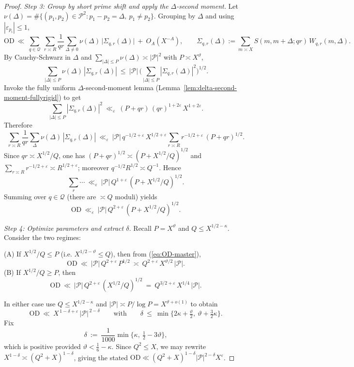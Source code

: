 \documentclass[11pt]{article}
\def\eqref#1{(\ref{#1})}%
\theoremstyle{definition}
\theoremstyle{remark}
\numberwithin{equation}{part}
\begin{document}
\begin{proof}
	\emph{Step 3: Group by short prime shift and apply the $\Delta$-second moment.}
	Let $\nu(\Delta)=\#\{(p_1,p_2)\in\mathcal P^2: p_1-p_2=\Delta,\ p_1\ne p_2\}$.
	Grouping by $\Delta$ and using $|\varepsilon_{p_i}|\le1$,
	\[
		\mathrm{OD}\ \ll\ \sum_{q\in\mathcal Q}\ \sum_{r\asymp R}\frac{1}{qr}
		\sum_{\Delta\ne 0}\nu(\Delta)\,\Big|\Sigma_{q,r}(\Delta)\Big|
		\ +\ O_A(X^{-A}),
		\qquad
		\Sigma_{q,r}(\Delta):=\sum_{m\asymp X} S(m,m+\Delta;qr)\,W_{q,r}(m,\Delta).
	\]
	By Cauchy-Schwarz in $\Delta$ and $\sum_{|\Delta|\le P}\nu(\Delta)\asymp|\mathcal P|^2$ with $P\asymp X^\vartheta$,
	\[
		\sum_{|\Delta|\le P}\nu(\Delta)\,|\Sigma_{q,r}(\Delta)|
		\ \le\ |\mathcal P|\,\Big(\sum_{|\Delta|\le P}|\Sigma_{q,r}(\Delta)|^2\Big)^{1/2}.
	\]
	Invoke the fully uniform $\Delta$-second-moment lemma (Lemma~\ref{lem:delta-second-moment-fullyrigid}) to get
	\[
		\sum_{|\Delta|\le P}|\Sigma_{q,r}(\Delta)|^2
		\ \ll_\varepsilon\ (P+qr)\,(qr)^{1+2\varepsilon}\,X^{1+2\varepsilon}.
	\]
	Therefore
	\[
		\sum_{r\asymp R}\frac{1}{qr}\sum_{\Delta}\nu(\Delta)\,|\Sigma_{q,r}(\Delta)|
		\ \ll_\varepsilon\ |\mathcal P|\,q^{-1/2+\varepsilon}\,X^{1/2+\varepsilon}
		\sum_{r\asymp R} r^{-1/2+\varepsilon}\,(P+qr)^{1/2}.
	\]
	Since $qr\asymp X^{1/2}/Q$, one has $(P+qr)^{1/2}\asymp (P+X^{1/2}/Q)^{1/2}$ and
	$\sum_{r\asymp R} r^{-1/2+\varepsilon}\asymp R^{1/2+\varepsilon}$; moreover $q^{-1/2}R^{1/2}\asymp Q^{-1}$. Hence
	\[
		\sum_{r}\cdots\ \ll_\varepsilon\ |\mathcal P|\,Q^{1+\varepsilon}\,(P+X^{1/2}/Q)^{1/2}.
	\]
	Summing over $q\in\mathcal Q$ (there are $\asymp Q$ moduli) yields
	\begin{equation}\label{eq:OD-master}
		\mathrm{OD}\ \ll_\varepsilon\ |\mathcal P|\,Q^{2+\varepsilon}\,(P+X^{1/2}/Q)^{1/2}.
	\end{equation}

	\emph{Step 4: Optimize parameters and extract $\delta$.}
	Recall $P=X^\vartheta$ and $Q\le X^{1/2-\kappa}$. Consider the two regimes:

	\smallskip
	\noindent(A) If $X^{1/2}/Q\le P$ (i.e. $X^{1/2-\vartheta}\le Q$), then from \eqref{eq:OD-master},
	\[
		\mathrm{OD}\ \ll\ |\mathcal P|\,Q^{2+\varepsilon}\,P^{1/2}
		\ \asymp\ Q^{2+\varepsilon}\,X^{\vartheta/2}\,|\mathcal P|.
	\]
	(B) If $X^{1/2}/Q\ge P$, then
	\[
		\mathrm{OD}\ \ll\ |\mathcal P|\,Q^{2+\varepsilon}\,(X^{1/2}/Q)^{1/2}
		\ =\ Q^{3/2+\varepsilon}\,X^{1/4}\,|\mathcal P|.
	\]

	In either case use $Q\le X^{1/2-\kappa}$ and $|\mathcal P|\asymp P/\log P=X^{\vartheta+o(1)}$ to obtain
	\[
		\mathrm{OD}\ \ll\ X^{\,1-\delta+\varepsilon}\,|\mathcal P|^{\,2-\delta}
		\qquad\text{with}\qquad
		\delta\ \le\ \min\Big\{2\kappa+\tfrac{\vartheta}{2},\ \vartheta+\tfrac{3}{2}\kappa\Big\}.
	\]
	Fix
	\[
		\delta\ :=\ \frac{1}{1000}\min\Big\{\kappa,\ \tfrac12-3\vartheta\Big\},
	\]
	which is positive provided $\vartheta<\tfrac16-\kappa$. Since $Q^2\le X$, we may rewrite $X^{1-\delta}\asymp (Q^2+X)^{1-\delta}$, giving the stated $\mathrm{OD}\ll (Q^2+X)^{1-\delta}|\mathcal P|^{2-\delta}X^\varepsilon$.


\end{proof}
\end{document}
